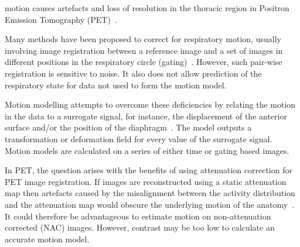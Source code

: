 \documentclass[journal]{IEEEtran}
\begin{document}
 motion causes artefacts and loss of resolution in the thoracic region in Positron Emission Tomography (PET)~\cite{Nehmeh2008}. %

Many methods have been proposed to correct for respiratory motion, usually involving image registration between a reference image and a set of images in different positions in the respiratory circle (gating)~\cite{Oliveira2014}. However, such pair-wise registration is sensitive to noise. It also does not allow prediction of the respiratory state for data not used to form the motion model.

Motion modelling attempts to overcome these deficiencies by relating the motion in the data to a surrogate signal, for instance, the displacement of the anterior surface and/or the position of the diaphragm~\cite{McClelland2013}.
The model outputs a transformation or deformation field for every value of the surrogate signal. Motion models are calculated on a series of either time or gating based images.

In PET, the question arises with the benefits of using attenuation correction for PET image registration. If images are reconstructed using a static attenuation map then artefacts caused by the misalignment between the activity distribution and the attenuation map would obscure the underlying motion of the anatomy~\cite{Bousse2016}. It could therefore be advantageous to estimate motion on non-attenuation corrected (NAC) images. However, contrast may be too low to calculate an accurate motion model. 


\end{document}
